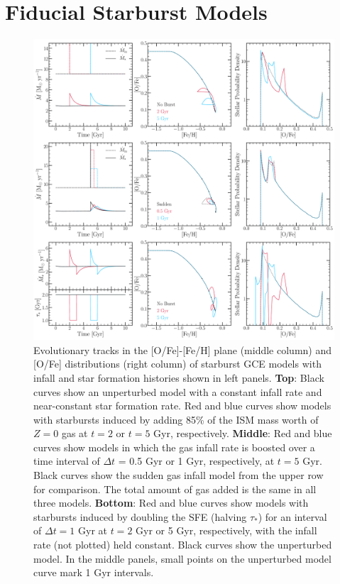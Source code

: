 
\section{Fiducial Starburst Models}
\label{bursts:sec:fiducial}

\begin{figure} %
\includegraphics[scale = 0.31]{fiducial_bursts.pdf}
\caption{
Evolutionary tracks in the [O/Fe]-[Fe/H] plane (middle column) and [O/Fe] 
distributions (right column) of starburst GCE models with infall and star 
formation histories shown in left panels. \textbf{Top}: Black curves show an 
unperturbed model with a constant infall rate and near-constant star formation 
rate. Red and blue curves show models with starbursts induced by adding 85\% of 
the ISM mass worth of $Z = 0$ gas at $t = 2$ or $t = 5$ Gyr, 
respectively. \textbf{Middle}: Red and blue curves show models in which the 
gas infall rate is boosted over a time interval of $\Delta t$ = 0.5 Gyr or 1 
Gyr, respectively, at $t = 5$ Gyr. Black curves show the sudden gas infall 
model from the upper row for comparison. The total amount of gas added is the 
same in all three models. \textbf{Bottom}: Red and blue curves show models with 
starbursts induced by doubling the SFE (halving $\tau_*$) for an interval of 
$\Delta t = 1$ Gyr at $t = 2$ Gyr or 5 Gyr, respectively, with the infall rate 
(not plotted) held constant. Black curves show the unperturbed model. In the 
middle panels, small points on the unperturbed model curve mark 1 Gyr 
intervals. 
}
\label{bursts:fig:fiducial_cases}
\end{figure} 


